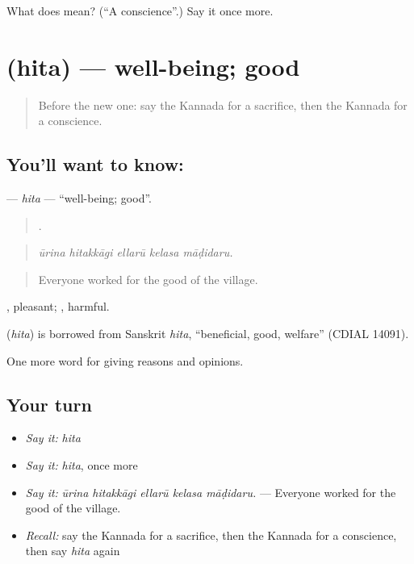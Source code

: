 \begin{tcolorbox}[breakable,colback=teal!4,colframe=teal!35!black,title={Before you move on}]
What does  mean? (\textquotedblleft{}A conscience\textquotedblright{}.) Say it once more.
\end{tcolorbox}
\section[\texorpdfstring{\kn{ಹಿತ} (hita)}{ಹಿತ (hita)}]{ (hita) — well-being; good}

\label{lesson:KA-C388-hita}



\begin{quote}
Before the new one: say the Kannada for a sacrifice, then the Kannada for a conscience.
\end{quote}

\subsection*{You'll want to know: }
\textbf{} — \emph{hita} — \textquotedblleft{}well-being; good\textquotedblright{}.

\begin{quote}
    .
\end{quote}

\begin{quote}
\emph{ūrina hitakkāgi ellarū kelasa māḍidaru.}
\end{quote}

\begin{quote}
Everyone worked for the good of the village.
\end{quote}

, pleasant; , harmful.

\begin{cousinweb}
\textbf{} (\emph{hita}) is borrowed from Sanskrit \emph{hita}, \textquotedblleft{}beneficial, good, welfare\textquotedblright{} (CDIAL 14091).
\end{cousinweb}

\begin{grammarlens}[title={What you've built}]
One more word for giving reasons and opinions.
\end{grammarlens}

\subsection*{Your turn}
\begin{itemize}
\raggedright
  \item \emph{Say it:} \emph{hita}
  \item \emph{Say it:} \emph{hita}, once more
  \item \emph{Say it:} \emph{ūrina hitakkāgi ellarū kelasa māḍidaru.} — Everyone worked for the good of the village.
  \item \emph{Recall:} say the Kannada for a sacrifice, then the Kannada for a conscience, then say \emph{hita} again
\end{itemize}

